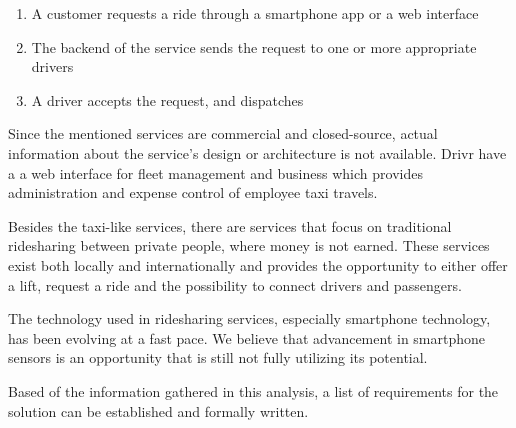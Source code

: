 \begin{enumerate}
	\item A customer requests a ride through a smartphone app or a web interface
	\item The backend of the service sends the request to one or more appropriate drivers
	\item A driver accepts the request, and dispatches
\end{enumerate}

Since the mentioned services are commercial and closed-source, actual information about the service's design or architecture is not available.
Drivr have a a web interface for fleet management and business which provides administration and expense control of employee taxi travels.

Besides the taxi-like services, there are services that focus on traditional ridesharing between private people, where money is not earned.
These services exist both locally and internationally and provides the opportunity to either offer a lift, request a ride and the possibility to connect drivers and passengers.



The technology used in ridesharing services, especially smartphone technology, has been evolving at a fast pace.
We believe that advancement in smartphone sensors is an opportunity that is still not fully utilizing its potential.

Based of the information gathered in this analysis, a list of requirements for the solution can be established and formally written.